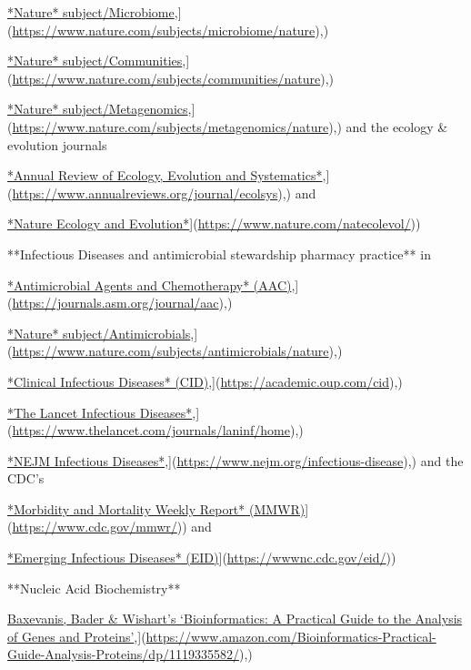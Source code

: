 \documentclass[
]{book}
\begin{document}
\href{\%5Bhttps://www.nature.com/subjects/microbiome/nature}{*Nature* subject/Microbiome},{]}(\url{https://www.nature.com/subjects/microbiome/nature}),)

\href{\%5Bhttps://www.nature.com/subjects/communities/nature}{*Nature* subject/Communities},{]}(\url{https://www.nature.com/subjects/communities/nature}),)

\href{\%5Bhttps://www.nature.com/subjects/metagenomics/nature}{*Nature* subject/Metagenomics},{]}(\url{https://www.nature.com/subjects/metagenomics/nature}),) and the ecology \& evolution journals

\href{\%5Bhttps://www.annualreviews.org/journal/ecolsys}{*Annual Review of Ecology, Evolution and Systematics*},{]}(\url{https://www.annualreviews.org/journal/ecolsys}),) and

\href{\%5Bhttps://www.nature.com/natecolevol/}{*Nature Ecology and Evolution*}{]}(\url{https://www.nature.com/natecolevol/}))

**Infectious Diseases and antimicrobial stewardship pharmacy practice** in

\href{\%5Bhttps://journals.asm.org/journal/aac}{*Antimicrobial Agents and Chemotherapy* (AAC)},{]}(\url{https://journals.asm.org/journal/aac}),)

\href{\%5Bhttps://www.nature.com/subjects/antimicrobials/nature}{*Nature* subject/Antimicrobials},{]}(\url{https://www.nature.com/subjects/antimicrobials/nature}),)

\href{\%5Bhttps://academic.oup.com/cid}{*Clinical Infectious Diseases* (CID)},{]}(\url{https://academic.oup.com/cid}),)

\href{\%5Bhttps://www.thelancet.com/journals/laninf/home}{*The Lancet Infectious Diseases*},{]}(\url{https://www.thelancet.com/journals/laninf/home}),)

\href{\%5Bhttps://www.nejm.org/infectious-disease}{*NEJM Infectious Diseases*},{]}(\url{https://www.nejm.org/infectious-disease}),) and the CDC's

\href{\%5Bhttps://www.cdc.gov/mmwr/}{*Morbidity and Mortality Weekly Report* (MMWR)}{]}(\url{https://www.cdc.gov/mmwr/})) and

\href{\%5Bhttps://wwwnc.cdc.gov/eid/}{*Emerging Infectious Diseases* (EID)}{]}(\url{https://wwwnc.cdc.gov/eid/}))

**Nucleic Acid Biochemistry**

\href{\%5Bhttps://www.amazon.com/Bioinformatics-Practical-Guide-Analysis-Proteins/dp/1119335582/}{Baxevanis, Bader \& Wishart's `Bioinformatics: A Practical Guide to the Analysis of Genes and Proteins'},{]}(\url{https://www.amazon.com/Bioinformatics-Practical-Guide-Analysis-Proteins/dp/1119335582/}),)
\end{document}
